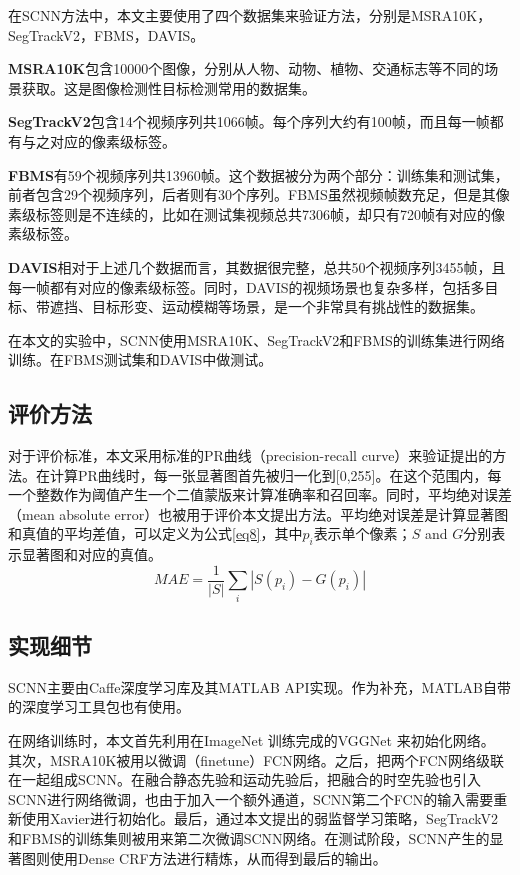 在SCNN方法中，本文主要使用了四个数据集来验证方法，分别是MSRA10K\cite{Liu2011Learning}，SegTrackV2\cite{li2013video}，FBMS\cite{brox2010object}，DAVIS\cite{perazzi2016benchmark}。

\textbf{MSRA10K}包含10000个图像，分别从人物、动物、植物、交通标志等不同的场景获取。这是图像检测性目标检测常用的数据集。

\textbf{SegTrackV2}包含14个视频序列共1066帧。每个序列大约有100帧，而且每一帧都有与之对应的像素级标签。

\textbf{FBMS}有59个视频序列共13960帧。这个数据被分为两个部分：训练集和测试集，前者包含29个视频序列，后者则有30个序列。FBMS虽然视频帧数充足，但是其像素级标签则是不连续的，比如在测试集视频总共7306帧，却只有720帧有对应的像素级标签。

\textbf{DAVIS}相对于上述几个数据而言，其数据很完整，总共50个视频序列3455帧，且每一帧都有对应的像素级标签。同时，DAVIS的视频场景也复杂多样，包括多目标、带遮挡、目标形变、运动模糊等场景，是一个非常具有挑战性的数据集。

在本文的实验中，SCNN使用MSRA10K、SegTrackV2和FBMS的训练集进行网络训练。在FBMS测试集和DAVIS中做测试。

\subsection{评价方法}
对于评价标准，本文采用标准的PR曲线（precision-recall curve）来验证提出的方法。在计算PR曲线时，每一张显著图首先被归一化到[0,255]。在这个范围内，每一个整数作为阈值产生一个二值蒙版来计算准确率和召回率。同时，平均绝对误差（mean absolute error）也被用于评价本文提出方法。平均绝对误差是计算显著图和真值的平均差值，可以定义为公式\ref{eq8}，其中$p_i$表示单个像素；$S$ and $G$分别表示显著图和对应的真值。
\begin{equation}
 \label{eq8}
   MAE = \frac{1}{|S|} \sum_i |S(p_i) - G(p_i)|
\end{equation}

\subsection{实现细节}

SCNN主要由Caffe深度学习库\cite{jia2014caffe}及其MATLAB API实现。作为补充，MATLAB自带的深度学习工具包\cite{Palm2012Prediction}也有使用。

在网络训练时，本文首先利用在ImageNet \cite{Russakovsky2015ImageNet}训练完成的VGGNet \cite{szegedy2015going}来初始化网络。 其次，MSRA10K被用以微调（finetune）FCN网络。之后，把两个FCN网络级联在一起组成SCNN。在融合静态先验和运动先验后，把融合的时空先验也引入SCNN进行网络微调，也由于加入一个额外通道，SCNN第二个FCN的输入需要重新使用Xavier进行初始化。最后，通过本文提出的弱监督学习策略，SegTrackV2和FBMS的训练集则被用来第二次微调SCNN网络。在测试阶段，SCNN产生的显著图则使用Dense CRF方法进行精炼，从而得到最后的输出。

